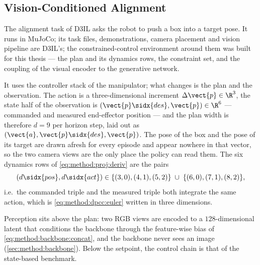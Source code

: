 \subsection{Vision-Conditioned Alignment}\label{sec:method:env:aligning}

The alignment task of D3IL \parencite{jia2024towards} asks the robot to push a box into a target
pose. It runs in MuJoCo; its task files, demonstrations, camera placement and vision pipeline are
D3IL's; the constrained-control environment
around them was built for this thesis --- the plan and its dynamics rows, the constraint set, and the
coupling of the visual encoder to the generative network.

It uses the controller stack of the manipulator; what changes is the plan and the observation. The action is a three-dimensional increment $\Delta\vect{p}\in\R^{3}$, the state
half of the observation is $(\vect{p}\sidx{des},\vect{p})\in\R^{6}$ --- commanded and measured
end-effector position --- and the plan width is therefore $d = 9$ per horizon step, laid out as
$(\vect{a},\vect{p}\sidx{des},\vect{p})$. The pose of the box and the pose of its target are drawn
afresh for every episode and appear nowhere in that vector, so the two camera views are the only
place the policy can read them.
 The six dynamics rows of
\eqref{eq:method:proj:deriv} are the pairs
\begin{equation}\label{eq:method:dep:varows}
  \left(d\sidx{pos},d\sidx{act}\right) \in
  \{(3,0),(4,1),(5,2)\}\;\cup\;\{(6,0),(7,1),(8,2)\},
\end{equation}
i.e.\ the commanded triple and the measured triple both integrate the same action, which is
\eqref{eq:method:dpcc:euler} written in three dimensions.

Perception sits above the plan: two RGB views are encoded to a $128$-dimensional latent that
conditions the backbone through the feature-wise bias of \eqref{eq:method:backbone:concat}, and the
backbone never sees an image (\autoref{sec:method:backbone}). Below the setpoint, the control chain is
that of the state-based benchmark.

